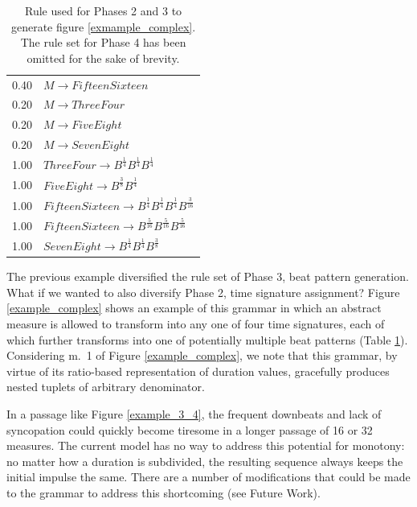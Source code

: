 \documentclass{article}
\begin{document}
\begin{table}
\centering
\begin{tabular}{ll}
0.40 & $M \rightarrow FifteenSixteen$\\
0.20 & $M \rightarrow ThreeFour$\\
0.20 & $M \rightarrow FiveEight$\\
0.20 & $M \rightarrow SevenEight$\\
1.00 & $ThreeFour \rightarrow B^\frac{1}{4} B^\frac{1}{4} B^\frac{1}{4}$\\
1.00 & $FiveEight \rightarrow B^\frac{3}{8} B^\frac{1}{4}$\\
1.00 & $FifteenSixteen \rightarrow B^\frac{1}{4} B^\frac{1}{4} B^\frac{1}{4} B^\frac{3}{16}$\\
1.00 & $FifteenSixteen \rightarrow B^\frac{5}{16} B^\frac{5}{16} B^\frac{5}{16}$\\
1.00 & $SevenEight \rightarrow B^\frac{1}{4} B^\frac{1}{4} B^\frac{3}{8}$\\
\end{tabular}
\caption{Rule used for Phases 2 and 3 to generate figure \ref{exmample_complex}. The rule set for Phase 4 has been omitted for the sake of brevity.}\label{complex_rules_phases23}
\end{table}

The previous example diversified the rule set of Phase 3, beat pattern generation. What if we wanted to also diversify Phase 2, time signature assignment? Figure \ref{example_complex} shows an example of this grammar in which an abstract measure is allowed to transform into any one of four time signatures, each of which further transforms into one of potentially multiple beat patterns (Table \ref{complex_rules_phases23}). Considering m.\ 1 of Figure \ref{example_complex}, we note that this grammar, by virtue of its ratio-based representation of duration values, gracefully produces nested tuplets of arbitrary denominator.

In a passage like Figure \ref{example_3_4}, the frequent downbeats and lack of syncopation could quickly become tiresome in a longer passage of 16 or 32 measures. The current model has no way to address this potential for monotony: no matter how a duration is subdivided, the resulting sequence always keeps the initial impulse the same. There are a number of modifications that could be made to the grammar to address this shortcoming (see Future Work).

\end{document}
